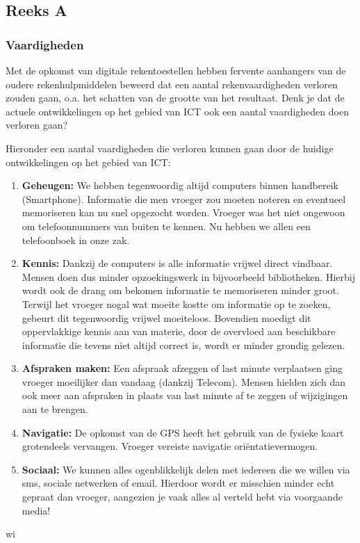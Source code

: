 \documentclass[../main.tex]{subfiles}
\begin{document}
\subsection{Reeks A}

\subsubsection{Vaardigheden}
\begin{question}Met de opkomst van digitale rekentoestellen hebben fervente aanhangers van de oudere rekenhulpmiddelen beweerd dat een aantal rekenvaardigheden verloren zouden gaan, o.a. het schatten van de grootte van het resultaat. Denk je dat de actuele ontwikkelingen op het gebied van ICT ook een aantal vaardigheden doen verloren gaan?
\end{question}

\begin{solution}
	Hieronder een aantal vaardigheden die verloren kunnen gaan door de huidige ontwikkelingen op het gebied van ICT:
	\begin{enumerate}
		\item \textbf{Geheugen:} We hebben tegenwoordig altijd computers binnen handbereik (Smartphone). Informatie die men vroeger zou moeten noteren en eventueel memoriseren kan nu snel opgezocht worden. Vroeger was het niet ongewoon
		om telefoonnummers van buiten te kennen. Nu hebben we allen een telefoonboek in onze zak.
		\item \textbf{Kennis:} Dankzij de computers is alle informatie vrijwel direct vindbaar. Mensen doen dus minder opzoekingswerk in bijvoorbeeld bibliotheken. Hierbij wordt ook de drang om bekomen informatie te memoriseren minder groot.
		Terwijl het vroeger nogal wat moeite kostte om informatie op te zoeken, gebeurt dit tegenwoordig vrijwel moeiteloos. Bovendien moedigt dit oppervlakkige kennis aan van materie, door de overvloed aan beschikbare informatie die tevens niet altijd correct is, wordt er minder grondig gelezen.
		\item \textbf{Afspraken maken:} Een afspraak afzeggen of last minute verplaatsen ging vroeger moeilijker dan vandaag (dankzij Telecom). Mensen hielden zich dan ook meer aan afspraken in plaats van last minute af te zeggen of wijzigingen aan te brengen.
		\item \textbf{Navigatie:} De opkomst van de GPS heeft het gebruik van de fysieke kaart grotendeels vervangen. Vroeger vereiste navigatie ori\"entatievermogen.
		\item \textbf{Sociaal:} We kunnen alles ogenblikkelijk delen met iedereen die we willen via sms, sociale netwerken of email. Hierdoor wordt er misschien minder echt gepraat dan vroeger, aangezien je vaak alles al verteld hebt via voorgaande media!

	\end{enumerate}
\end{solution}wi
\end{document}
